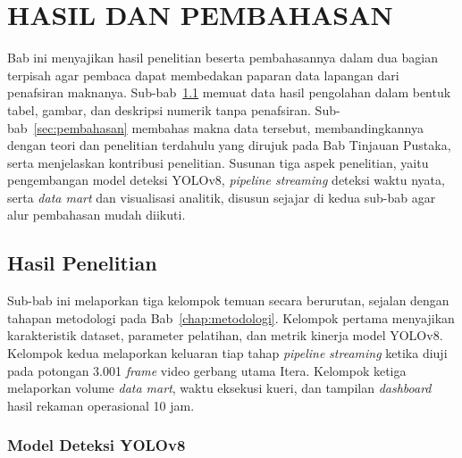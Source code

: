 
\chapter{HASIL DAN PEMBAHASAN}
\label{chap:hasil}

Bab ini menyajikan hasil penelitian beserta pembahasannya dalam dua bagian terpisah agar pembaca dapat membedakan paparan data lapangan dari penafsiran maknanya. Sub-bab~\ref{sec:hasil} memuat data hasil pengolahan dalam bentuk tabel, gambar, dan deskripsi numerik tanpa penafsiran. Sub-bab~\ref{sec:pembahasan} membahas makna data tersebut, membandingkannya dengan teori dan penelitian terdahulu yang dirujuk pada Bab Tinjauan Pustaka, serta menjelaskan kontribusi penelitian. Susunan tiga aspek penelitian, yaitu pengembangan model deteksi YOLOv8, \textit{pipeline streaming} deteksi waktu nyata, serta \textit{data mart} dan visualisasi analitik, disusun sejajar di kedua sub-bab agar alur pembahasan mudah diikuti.

\section{Hasil Penelitian}
\label{sec:hasil}

Sub-bab ini melaporkan tiga kelompok temuan secara berurutan, sejalan dengan tahapan metodologi pada Bab~\ref{chap:metodologi}. Kelompok pertama menyajikan karakteristik dataset, parameter pelatihan, dan metrik kinerja model YOLOv8. Kelompok kedua melaporkan keluaran tiap tahap \textit{pipeline} \textit{streaming} ketika diuji pada potongan 3.001 \textit{frame} video gerbang utama Itera. Kelompok ketiga melaporkan volume \textit{data mart}, waktu eksekusi kueri, dan tampilan \textit{dashboard} hasil rekaman operasional 10 jam.

\subsection{Model Deteksi YOLOv8}
\label{subsec:hasil-model}

